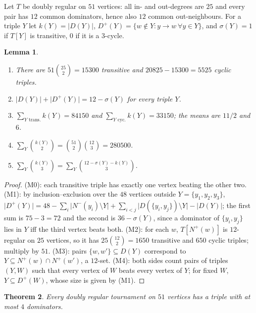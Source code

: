 \documentclass[11pt]{amsart}
\newtheorem{theorem}{Theorem}[section]
\newtheorem{lemma}[theorem]{Lemma}
\theoremstyle{definition}
\theoremstyle{remark}
\newcommand{\D}{D}
\newcommand{\Dp}{D^{+}}
\newcommand{\Nin}{N^{-}}
\newcommand{\Nout}{N^{+}}
\newcommand{\abs}[1]{\lvert #1\rvert}
\begin{document}
Let $T$ be doubly regular on $51$ vertices: all in- and out-degrees are $25$ and every pair has $12$ common dominators, hence also
$12$ common out-neighbours. For a triple $Y$ let $k(Y)=\abs{\D(Y)}$, $\Dp(Y)=\{w\notin Y: y\to w\ \forall y\in Y\}$, and
$\sigma(Y)=1$ if $T[Y]$ is transitive, $0$ if it is a $3$-cycle.

\begin{lemma}\label{lem:M}
\begin{enumerate}[label=(M\arabic*),start=0]
\item There are $51\binom{25}2=15300$ transitive and $20825-15300=5525$ cyclic triples.
\item $\abs{\D(Y)}+\abs{\Dp(Y)}=12-\sigma(Y)$ for every triple $Y$.
\item $\sum_{Y\text{ trans.}}k(Y)=84150$ and $\sum_{Y\text{ cyc.}}k(Y)=33150$; the means are $11/2$ and $6$.
\item $\sum_Y\binom{k(Y)}2=\binom{51}2\binom{12}3=280500$.
\item $\sum_Y\binom{k(Y)}3=\sum_Y\binom{12-\sigma(Y)-k(Y)}3$.
\end{enumerate}
\end{lemma}

\begin{proof}
(M0): each transitive triple has exactly one vertex beating the other two. (M1): by inclusion--exclusion over the $48$ vertices
outside $Y=\{y_1,y_2,y_3\}$, $\abs{\Dp(Y)}=48-\sum_i\abs{\Nin(y_i)\setminus Y}+\sum_{i<j}\abs{\D(\{y_i,y_j\})\setminus Y}-\abs{\D(Y)}$;
the first sum is $75-3=72$ and the second is $36-\sigma(Y)$, since a dominator of $\{y_i,y_j\}$ lies in $Y$ iff the third vertex beats
both. (M2): for each $w$, $T[\Nout(w)]$ is $12$-regular on $25$ vertices, so it has $25\binom{12}2=1650$ transitive and $650$ cyclic
triples; multiply by $51$. (M3): pairs $\{w,w'\}\subseteq\D(Y)$ correspond to $Y\subseteq\Nout(w)\cap\Nout(w')$, a $12$-set. (M4): both
sides count pairs of triples $(Y,W)$ such that every vertex of $W$ beats every vertex of $Y$; for fixed $W$, $Y\subseteq\Dp(W)$, whose
size is given by (M1).
\end{proof}

\begin{theorem}\label{thm:drt}
Every doubly regular tournament on $51$ vertices has a triple with at most $4$ dominators.
\end{theorem}
\end{document}
